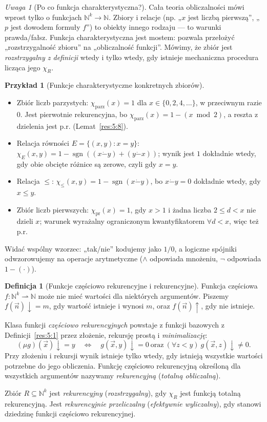 \documentclass[11pt,a4paper]{article}
\numberwithin{equation}{section}
\newcommand{\dotminus}{\mathbin{\dot-}}
\theoremstyle{plain}
\theoremstyle{definition}
\newtheorem{definicja}[twierdzenie]{Definicja}
\newtheorem{przyklad}[twierdzenie]{Przykład}
\theoremstyle{remark}
\newtheorem{uwaga}[twierdzenie]{Uwaga}
\begin{document}
\begin{uwaga}[Po co funkcja charakterystyczna?]\label{res:5:3}
Cała teoria obliczalności mówi wprost tylko o funkcjach $\mathbb N^k\to\mathbb N$. Zbiory i relacje (np. „$x$ jest liczbą pierwszą”, „$p$ jest dowodem formuły $f$”) to obiekty innego rodzaju --- to warunki prawda/fałsz. Funkcja charakterystyczna jest mostem: pozwala przełożyć „rozstrzygalność zbioru” na „obliczalność funkcji”. Mówimy, że zbiór jest \emph{rozstrzygalny z definicji} wtedy i tylko wtedy, gdy istnieje mechaniczna procedura licząca jego $\chi_R$.
\end{uwaga}

\begin{przyklad}[Funkcje charakterystyczne konkretnych zbiorów]\label{res:5:4}
\begin{itemize}
\item Zbiór liczb parzystych: $\chi_{\mathrm{parz}}(x)=1$ dla $x\in\{0,2,4,\ldots\}$, w przeciwnym razie $0$. Jest pierwotnie rekurencyjna, bo $\chi_{\mathrm{parz}}(x)=1-(x\bmod 2)$, a reszta z dzielenia jest p.r. (Lemat~\ref{res:5:8}).
\item Relacja równości $E=\{(x,y):x=y\}$: $\chi_E(x,y)=1-\operatorname{sgn}((x\dotminus y)+(y\dotminus x))$; wynik jest $1$ dokładnie wtedy, gdy obie obcięte różnice są zerowe, czyli gdy $x=y$.
\item Relacja $\le$: $\chi_{\le}(x,y)=1-\operatorname{sgn}(x\dotminus y)$, bo $x\dotminus y=0$ dokładnie wtedy, gdy $x\le y$.
\item Zbiór liczb pierwszych: $\chi_{\mathrm{pr}}(x)=1$, gdy $x>1$ i żadna liczba $2\le d<x$ nie dzieli $x$; warunek wyrażalny ograniczonym kwantyfikatorem $\forall d<x$, więc też p.r.
\end{itemize}
Widać wspólny wzorzec: „tak/nie” kodujemy jako $1/0$, a logiczne spójniki odwzorowujemy na operacje arytmetyczne ($\land$ odpowiada mnożeniu, $\neg$ odpowiada $1-(\cdot)$).
\end{przyklad}

\begin{definicja}[Funkcje częściowo rekurencyjne i rekurencyjne]\label{res:5:5}
Funkcja częściowa $f:\mathbb N^k\rightharpoonup\mathbb N$ może nie mieć wartości dla niektórych argumentów. Piszemy $f(\vec n)\downarrow=m$, gdy wartość istnieje i wynosi $m$, oraz $f(\vec n)\uparrow$, gdy nie istnieje.

Klasa funkcji \emph{częściowo rekurencyjnych} powstaje z funkcji bazowych z Definicji~\ref{res:5:1} przez złożenie, rekursję prostą i \emph{minimalizację}:
\[
(\mu g)(\vec x)\downarrow=y\quad\Longleftrightarrow\quad
g(\vec x,y)\downarrow=0\ \text{oraz}\ (\forall z<y)\ g(\vec x,z)\downarrow\ne0.
\]
Przy złożeniu i rekursji wynik istnieje tylko wtedy, gdy istnieją wszystkie wartości potrzebne do jego obliczenia. Funkcję częściowo rekurencyjną określoną dla wszystkich argumentów nazywamy \emph{rekurencyjną} (\emph{totalną obliczalną}).

Zbiór $R\subseteq\mathbb N^k$ jest \emph{rekurencyjny} (\emph{rozstrzygalny}), gdy $\chi_R$ jest funkcją totalną rekurencyjną. Jest \emph{rekurencyjnie przeliczalny} (\emph{efektywnie wyliczalny}), gdy stanowi dziedzinę funkcji częściowo rekurencyjnej.
\end{definicja}
\end{document}
